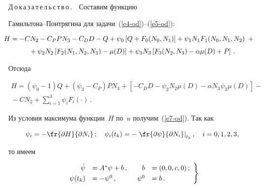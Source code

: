 \smallskip





\noindent


Д\,о\,к\,а\,з\,а\,т\,е\,л\,ь\,с\,т\,в\,о\,.\ \  Составим функцию  


Га\-миль\-то\-на--Понт\-ря\-ги\-на для задачи~(\ref{e4-od})--(\ref{e5-od}):


\begin{multline*}


\hspace*{-7.46pt}H=-CN_2-C_P P N_3-C_DD -Q+\psi_0\left[ Q+F_0(N_0, N_1)\right]+\psi_1 N_1 


F_1(N_0, N_1, N_2)\;+{}\\[3pt]


{}+ \psi_2 N_2\left[ F_2(N_1, N_2, N_3)-\mu(D)\right] +\psi_3 N_3 \left[ F_3(N_2, 


N_3)-\alpha\mu(D)+P\right]\,.


\end{multline*}


Отсюда 


\begin{multline*}


H=\left(\psi_0-1\right) Q+\left(\psi_3-C_P\right) PN_3 +\left[ -C_D D -\psi_2 N_2 


\mu(D) -\alpha N_3 \psi_3 \mu(D)\right] -{}\\


{}-CN_2 +\sum\limits^3_{i=1} \psi_i 


F_i(\cdot)\,.


\end{multline*}


Из условия максимума функции~$H$ по~$u$ получим~(\ref{e7-od}). Так как 


$$


\psi_i=-\fr{\partial H}{\partial N_i}\,;\quad \psi_i(t_k) =-\left.\fr{\partial 


\psi}{\partial N_i}\right\vert_{t_k},\quad i=0,1,2,3,


$$


 то имеем


\begin{equation}


\left.


\begin{array}{rlrl}


\dot{\psi} &= A^*\psi+b\,,&\enskip b&=(0,0,c,0)\,;\\[3pt]


\psi(t_k)& =-\psi^0\,,&\enskip \psi^0&=b\,.


\end{array}


\right\}


\label{e8-od}


\end{equation}


